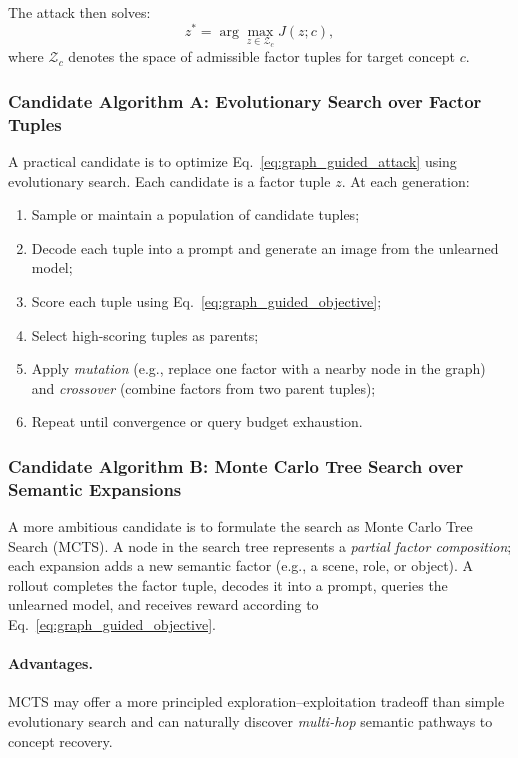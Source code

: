 The attack then solves:
\begin{equation}
z^* = \arg\max_{z \in \mathcal{Z}_c} J(z;c),
\label{eq:graph_guided_attack}
\end{equation}
where $\mathcal{Z}_c$ denotes the space of admissible factor tuples for target concept $c$.

\subsubsection{Candidate Algorithm A: Evolutionary Search over Factor Tuples}
\label{subsubsec:algorithmA}

A practical candidate is to optimize Eq.~\ref{eq:graph_guided_attack} using evolutionary search. Each candidate is a factor tuple $z$. At each generation:
\begin{enumerate}
    \item Sample or maintain a population of candidate tuples;
    \item Decode each tuple into a prompt and generate an image from the unlearned model;
    \item Score each tuple using Eq.~\ref{eq:graph_guided_objective};
    \item Select high-scoring tuples as parents;
    \item Apply \emph{mutation} (e.g., replace one factor with a nearby node in the graph) and \emph{crossover} (combine factors from two parent tuples);
    \item Repeat until convergence or query budget exhaustion.
\end{enumerate}


\subsubsection{Candidate Algorithm B: Monte Carlo Tree Search over Semantic Expansions}
\label{subsubsec:algorithmB}

A more ambitious candidate is to formulate the search as Monte Carlo Tree Search (MCTS). A node in the search tree represents a \emph{partial factor composition}; each expansion adds a new semantic factor (e.g., a scene, role, or object). A rollout completes the factor tuple, decodes it into a prompt, queries the unlearned model, and receives reward according to Eq.~\ref{eq:graph_guided_objective}.

\paragraph{Advantages.}
MCTS may offer a more principled exploration--exploitation tradeoff than simple evolutionary search and can naturally discover \emph{multi-hop} semantic pathways to concept recovery.

